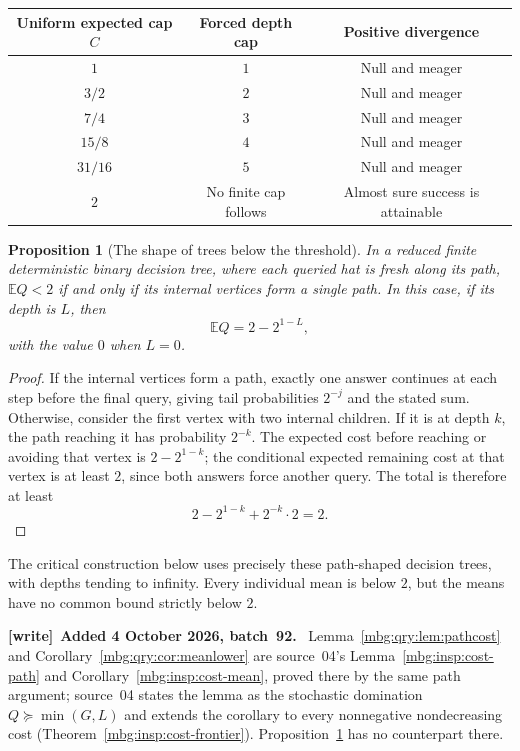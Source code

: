 \documentclass[11pt,letterpaper]{article}
\newtheorem{proposition}[theorem]{Proposition}
\theoremstyle{definition}
\newcommand{\E}{\mathbb E}
\newenvironment{writenote}[1][]{\par\smallskip\begingroup\small
 \noindent\textbf{[write]}\if\relax\detokenize{#1}\relax\else~\textbf{#1.}\fi\ }%
 {\par\endgroup\smallskip}
\begin{document}
\begin{center}
\begin{tabular}{c c c}
\toprule
Uniform expected cap \(C\)&Forced depth cap&Positive divergence\\
\midrule
\(1\)&\(1\)&Null and meager\\
\(3/2\)&\(2\)&Null and meager\\
\(7/4\)&\(3\)&Null and meager\\
\(15/8\)&\(4\)&Null and meager\\
\(31/16\)&\(5\)&Null and meager\\
\(2\)&No finite cap follows&Almost sure success is attainable\\
\bottomrule
\end{tabular}
\end{center}

\begin{proposition}[The shape of trees below the threshold]
\label{mbg:qry:prop:comb}
In a reduced finite deterministic binary decision tree, where each queried
hat is fresh along its path, \(\E Q<2\) if and only if its internal
vertices form a single path. In this case, if its depth is \(L\), then
\[
 \E Q=2-2^{1-L},
\]
with the value \(0\) when \(L=0\).
\end{proposition}

\begin{proof}
If the internal vertices form a path, exactly one answer continues at
each step before the final query, giving tail probabilities \(2^{-j}\)
and the stated sum.
Otherwise, consider the first vertex with two internal children.
If it is at depth \(k\), the path reaching it has probability \(2^{-k}\).
The expected cost before reaching or avoiding that vertex is
\(2-2^{1-k}\); the conditional expected remaining cost at that vertex
is at least \(2\), since both answers force another query.
The total is therefore at least
\[
 2-2^{1-k}+2^{-k}\cdot2=2.
\]
\end{proof}

The critical construction below uses precisely these path-shaped
decision trees, with depths tending to infinity. Every individual mean
is below \(2\), but the means have no common bound strictly below \(2\).

\begin{writenote}[Added 4 October 2026, batch~92]
Lemma~\ref{mbg:qry:lem:pathcost} and Corollary~\ref{mbg:qry:cor:meanlower} are source~04's Lemma~\ref{mbg:insp:cost-path} and Corollary~\ref{mbg:insp:cost-mean}, proved there by the same path argument; source~04 states the lemma as the stochastic domination $Q\succeq\min(G,L)$ and extends the corollary to every nonnegative nondecreasing cost (Theorem~\ref{mbg:insp:cost-frontier}). Proposition~\ref{mbg:qry:prop:comb} has no counterpart there.
\end{writenote}
\end{document}
